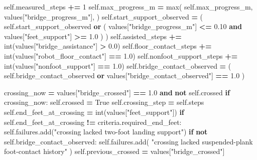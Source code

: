 \documentclass[
  chinese,
  11pt,
  letterpaper,
]{article}
\newenvironment{Shaded}{\begin{snugshade}}{\end{snugshade}}
\newcommand{\BuiltInTok}[1]{#1}
\newcommand{\ControlFlowTok}[1]{\textcolor[rgb]{0.13,0.29,0.53}{\textbf{#1}}}
\newcommand{\DecValTok}[1]{\textcolor[rgb]{0.00,0.00,0.81}{#1}}
\newcommand{\FloatTok}[1]{\textcolor[rgb]{0.00,0.00,0.81}{#1}}
\newcommand{\KeywordTok}[1]{\textcolor[rgb]{0.13,0.29,0.53}{\textbf{#1}}}
\newcommand{\NormalTok}[1]{#1}
\newcommand{\OperatorTok}[1]{\textcolor[rgb]{0.81,0.36,0.00}{\textbf{#1}}}
\newcommand{\StringTok}[1]{\textcolor[rgb]{0.31,0.60,0.02}{#1}}
\newcommand{\VariableTok}[1]{\textcolor[rgb]{0.00,0.00,0.00}{#1}}
\renewenvironment{Shaded}{\par\smallskip}{\par\smallskip}
\begin{document}
\begin{Shaded}
\begin{Highlighting}[]
        \VariableTok{self}\NormalTok{.measured\_steps }\OperatorTok{+=} \DecValTok{1}
        \VariableTok{self}\NormalTok{.max\_progress\_m }\OperatorTok{=} \BuiltInTok{max}\NormalTok{(}
            \VariableTok{self}\NormalTok{.max\_progress\_m,}
\NormalTok{            values[}\StringTok{"bridge\_progress\_m"}\NormalTok{],}
\NormalTok{        )}
        \VariableTok{self}\NormalTok{.start\_support\_observed }\OperatorTok{=}\NormalTok{ (}
            \VariableTok{self}\NormalTok{.start\_support\_observed}
            \KeywordTok{or}\NormalTok{ (}
\NormalTok{                values[}\StringTok{"bridge\_progress\_m"}\NormalTok{] }\OperatorTok{\textless{}=} \FloatTok{0.10}
                \KeywordTok{and}\NormalTok{ values[}\StringTok{"feet\_support"}\NormalTok{] }\OperatorTok{\textgreater{}=} \FloatTok{1.0}
\NormalTok{            )}
\NormalTok{        )}
        \VariableTok{self}\NormalTok{.assisted\_steps }\OperatorTok{+=} \BuiltInTok{int}\NormalTok{(values[}\StringTok{"bridge\_assistance"}\NormalTok{] }\OperatorTok{\textgreater{}} \FloatTok{0.0}\NormalTok{)}
        \VariableTok{self}\NormalTok{.floor\_contact\_steps }\OperatorTok{+=} \BuiltInTok{int}\NormalTok{(values[}\StringTok{"robot\_floor\_contact"}\NormalTok{] }\OperatorTok{==} \FloatTok{1.0}\NormalTok{)}
        \VariableTok{self}\NormalTok{.nonfoot\_support\_steps }\OperatorTok{+=} \BuiltInTok{int}\NormalTok{(values[}\StringTok{"nonfoot\_support"}\NormalTok{] }\OperatorTok{==} \FloatTok{1.0}\NormalTok{)}
        \VariableTok{self}\NormalTok{.bridge\_contact\_observed }\OperatorTok{=}\NormalTok{ (}
            \VariableTok{self}\NormalTok{.bridge\_contact\_observed}
            \KeywordTok{or}\NormalTok{ values[}\StringTok{"bridge\_contact\_observed"}\NormalTok{] }\OperatorTok{==} \FloatTok{1.0}
\NormalTok{        )}

\NormalTok{        crossing\_now }\OperatorTok{=}\NormalTok{ values[}\StringTok{"bridge\_crossed"}\NormalTok{] }\OperatorTok{==} \FloatTok{1.0} \KeywordTok{and} \KeywordTok{not} \VariableTok{self}\NormalTok{.crossed}
        \ControlFlowTok{if}\NormalTok{ crossing\_now:}
            \VariableTok{self}\NormalTok{.crossed }\OperatorTok{=} \VariableTok{True}
            \VariableTok{self}\NormalTok{.crossing\_step }\OperatorTok{=} \VariableTok{self}\NormalTok{.steps}
            \VariableTok{self}\NormalTok{.end\_feet\_at\_crossing }\OperatorTok{=} \BuiltInTok{int}\NormalTok{(values[}\StringTok{"feet\_support"}\NormalTok{])}
            \ControlFlowTok{if} \VariableTok{self}\NormalTok{.end\_feet\_at\_crossing }\OperatorTok{!=}\NormalTok{ criteria.required\_end\_feet:}
                \VariableTok{self}\NormalTok{.failures.add(}\StringTok{"crossing lacked two{-}foot landing support"}\NormalTok{)}
            \ControlFlowTok{if} \KeywordTok{not} \VariableTok{self}\NormalTok{.bridge\_contact\_observed:}
                \VariableTok{self}\NormalTok{.failures.add(}
                    \StringTok{"crossing lacked suspended{-}plank foot{-}contact history"}
\NormalTok{                )}
        \VariableTok{self}\NormalTok{.previous\_crossed }\OperatorTok{=}\NormalTok{ values[}\StringTok{"bridge\_crossed"}\NormalTok{]}


\end{Highlighting}
\end{Shaded}
\end{document}

